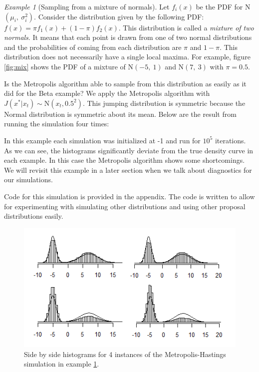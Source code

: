 \documentclass[11pt]{amsart}
\theoremstyle{theorem} %
\theoremstyle{definition}                  %
\theoremstyle{example}                       %
\theoremstyle{remark}                       %
\newtheorem{exmp}[thm]{Example}  %
\numberwithin{equation}{section}
\begin{document}
\begin{exmp}[Sampling from a mixture of normals]
\label{ex:mixture}
    Let $f_i(x)$ be the PDF for N$(\mu_i,~\sigma_i^2)$. Consider the distribution given by the following PDF: $f(x)=\pi f_1(x)+ (1-\pi)f_2(x)$. This distribution is called a {\em mixture of two normals}. It means that each point is drawn from one of two normal distributions and the probabilities of coming from each distribution are $\pi$ and $1-\pi$. This distribution does not necessarily have a single local maxima. For example, figure \ref{fig:mix} shows the PDF of a mixture of N$(-5,~1)$ and N$(7,~3)$ with $\pi=0.5$.
    
    Is the Metropolis algorithm able to sample from this distribution as easily as it did for the Beta example? We apply the Metropolis algorithm with $J(x^*|x_t)\sim \text{N}(x_t, 0.5^2)$. This jumping distribution is symmetric because the Normal distribution is symmetric about its mean. Below are the result from running the simulation four times:

    In this example each simulation was initialized at -1 and run for $10^5$ iterations. As we can see, the histograms significantly deviate from the true density curve in each example. In this case the Metropolis algorithm shows some shortcomings. We will revisit this example in a later section when we talk about diagnostics for our simulations.
    
    Code for this simulation is provided in the appendix. The code is written to allow for experimenting with simulating other distributions and using other proposal distributions easily.
    
        \begin{figure}[h]
        \centering
        \includegraphics[width = 5 in]{bigger4ex.png}
        \caption{Side by side histograms for 4 instances of the Metropolis-Hastings simulation in example \ref{ex:mixture}.}
        \label{fig:4way}
    \end{figure}
\end{exmp}
\end{document}
